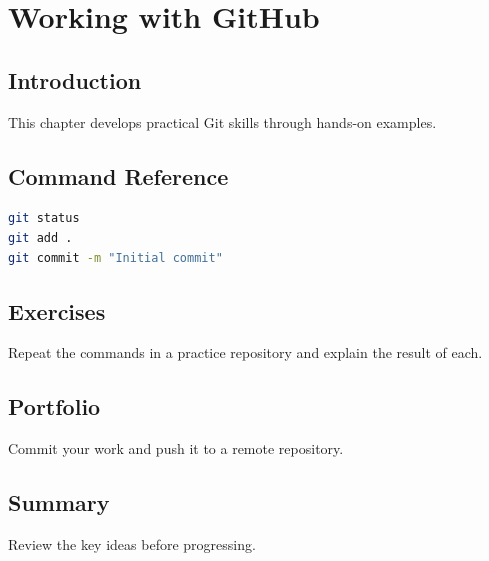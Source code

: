 \chapter{Working with GitHub}
\label{chap:vol2-8}



\section{Introduction}
This chapter develops practical Git skills through hands-on examples.

\section{Command Reference}
\begin{lstlisting}[language=bash]
git status
git add .
git commit -m "Initial commit"
\end{lstlisting}

\section{Exercises}
\begin{exercise}
Repeat the commands in a practice repository and explain the result of each.
\end{exercise}

\section{Portfolio}
Commit your work and push it to a remote repository.

\section{Summary}
Review the key ideas before progressing.
